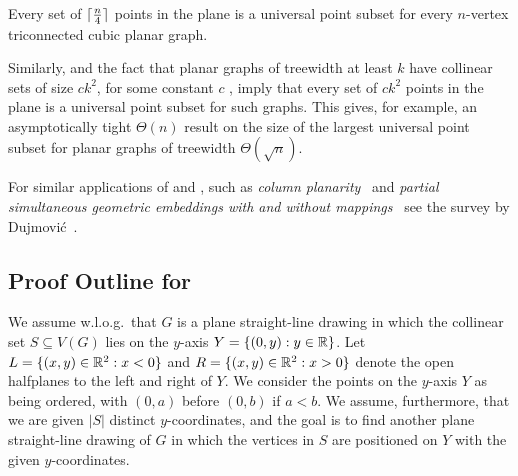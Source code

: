 \begin{cor}
Every set of ${\lceil \frac{n}{4} \rceil}$ points in the plane  is a universal
point subset for  every $n$-vertex triconnected cubic
planar graph.
\end{cor}

Similarly,  and the fact that planar graphs of
treewidth at least $k$ have collinear sets of size $ck^2$, for some
constant $c$ \cite{dalozzo.dujmovic.ea:drawing}, imply that every set
of  $c k^2$ points in the plane is a universal point subset for  such
graphs. This gives, for example, an asymptotically tight  $\Theta(n)$
result on the size of the largest universal point subset for planar
graphs of treewidth $\Theta(\sqrt{n})$. 

For similar applications of 
and , such as \emph{column
planarity}~\cite{behks-cppsge-17,dalozzo.dujmovic.ea:drawing,dujmovic:utility}
and \emph{partial simultaneous geometric embeddings with and without
mappings}~\cite{behks-cppsge-17,ddlmw-pqp-15,dujmovic:utility} see the
survey by Dujmovi\'c~\cite{dujmovic:utility}.



\subsection{Proof Outline for }

We assume w.l.o.g.\ that $G$ is a plane straight-line
drawing in which the collinear set $S\subseteq V(G)$ lies
on the $y$-axis $Y=\{(0,y):y\in\mathbb{R}\}$. Let
$L=\{(x,y)\in\mathbb{R}^2:x<0\}$ and $R=\{(x,y)\in\mathbb{R}^2: x >0\}$ denote the open
halfplanes to the left and right of $Y$.
We consider the points on the $y$-axis $Y$ as being ordered,
with $(0,a)$ before $(0,b)$ if $a<b$. 
We
assume, furthermore, that we are given $|S|$ distinct $y$-coordinates,
and the goal is to find another plane straight-line drawing of $G$ in
which the vertices in $S$ are positioned on $Y$ with the given $y$-coordinates.

